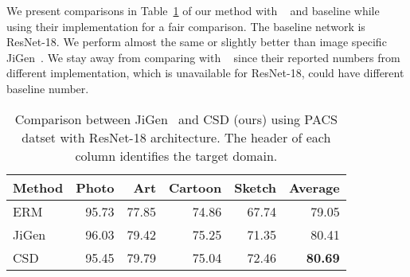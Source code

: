 \documentclass{article}
\begin{document}
We present comparisons in Table~\ref{tab:expt:pacs} of our method with ~\cite{CarlucciAS2019} and baseline while using their implementation for a fair comparison. The baseline network is ResNet-18. We perform almost the same or slightly better than image specific JiGen~\cite{CarlucciAS2019}. We stay away from comparing with ~\cite{DouCK19} since their reported numbers from different implementation, which is unavailable for ResNet-18, could have different baseline number.

\begin{table}[htb]
    \centering
    \begin{tabular}{|l|r|r|r|r|r|}
    \hline
    Method & Photo & Art & Cartoon & Sketch & Average \\
    \hline
         ERM & 95.73 & 77.85 & 74.86 & 67.74 & 79.05 \\
         JiGen & 96.03 & 79.42 & 75.25 & 71.35 & 80.41 \\
         CSD & 95.45 & 79.79 & 75.04 & 72.46 & {\bf 80.69} \\
    \hline
    \end{tabular}
    \caption{Comparison between JiGen~\cite{CarlucciAS2019} and CSD (ours) using PACS datset with ResNet-18 architecture. The header of each column identifies the target domain.}
    \label{tab:expt:pacs}
\end{table}{}
\end{document}
